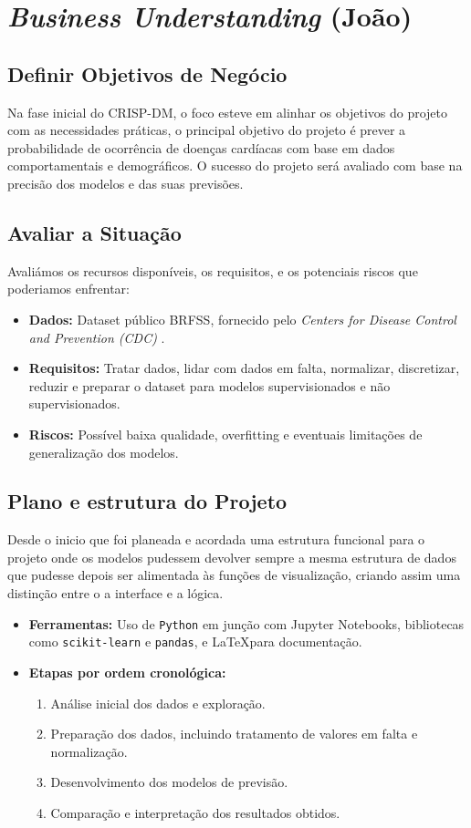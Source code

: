 \chapter{\textit{Business Understanding} (João)}
\label{chap:bus}

\section{Definir Objetivos de Negócio}
Na fase inicial do CRISP-DM, o foco esteve em alinhar os objetivos do projeto com as necessidades práticas, o principal objetivo do projeto é prever a probabilidade de ocorrência de doenças cardíacas com base em dados comportamentais e demográficos. O sucesso do projeto será avaliado com base na precisão dos modelos e das suas previsões.

\section{Avaliar a Situação}
Avaliámos os recursos disponíveis, os requisitos, e os potenciais riscos que poderiamos enfrentar:
\begin{itemize}
    \item \textbf{Dados:} Dataset público BRFSS, fornecido pelo \textit{Centers for Disease Control and Prevention (CDC)} \citep{brfss2021}.
    \item \textbf{Requisitos:} Tratar dados, lidar com dados em falta, normalizar, discretizar, reduzir e preparar o dataset para modelos supervisionados e não supervisionados.
    \item \textbf{Riscos:} Possível baixa qualidade, overfitting e eventuais limitações de generalização dos modelos.
\end{itemize}

\section{Plano e estrutura do Projeto}

Desde o inicio que foi planeada e acordada uma estrutura funcional para o projeto onde os modelos pudessem devolver sempre a mesma estrutura de dados que pudesse depois ser alimentada às funções de visualização, criando assim uma distinção entre o a interface e a lógica.
\begin{itemize}
    \item \textbf{Ferramentas:} Uso de \texttt{Python} em junção com Jupyter Notebooks, bibliotecas como \texttt{scikit-learn} e \texttt{pandas}, e \LaTeX para documentação.
    \item \textbf{Etapas por ordem cronológica:}
    \begin{enumerate}
        \item Análise inicial dos dados e exploração.
        \item Preparação dos dados, incluindo tratamento de valores em falta e normalização.
        \item Desenvolvimento dos modelos de previsão.
        \item Comparação e interpretação dos resultados obtidos.
    \end{enumerate}
\end{itemize}
